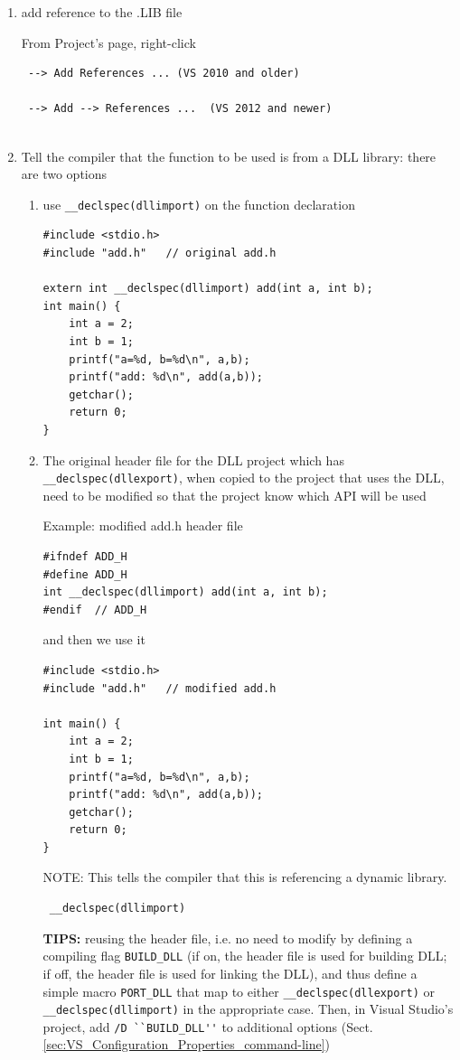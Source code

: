 \begin{enumerate}
  \item add reference to the .LIB file
  
From Project's page, right-click
\begin{verbatim}
 --> Add References ... (VS 2010 and older)
 
 --> Add --> References ...  (VS 2012 and newer)
 
\end{verbatim}
  
  
   \item Tell the compiler that the function to be used is from a DLL library: there are two options
   \begin{enumerate}
     \item use \verb!__declspec(dllimport)! on the function declaration
\begin{verbatim}
#include <stdio.h>
#include "add.h"   // original add.h

extern int __declspec(dllimport) add(int a, int b);
int main() {
    int a = 2;
    int b = 1;
    printf("a=%d, b=%d\n", a,b);
    printf("add: %d\n", add(a,b));
    getchar();
    return 0;
}
\end{verbatim}  
     
   \item The original header file for the DLL project which has \verb!__declspec(dllexport)!, when copied to the
   project that uses the DLL, need to be modified so that the project know which API will be used

Example: modified add.h header file
\begin{verbatim}
#ifndef ADD_H
#define ADD_H
int __declspec(dllimport) add(int a, int b);
#endif  // ADD_H
\end{verbatim}

and then we use it
\begin{verbatim}
#include <stdio.h>
#include "add.h"   // modified add.h

int main() {
    int a = 2;
    int b = 1;
    printf("a=%d, b=%d\n", a,b);
    printf("add: %d\n", add(a,b));
    getchar();
    return 0;
}
\end{verbatim}

NOTE: This tells the compiler that this is referencing a dynamic library.
\begin{verbatim}
 __declspec(dllimport)
\end{verbatim} 
 
 
{\bf TIPS:} reusing the header file, i.e. no need to modify by defining a compiling flag
\verb!BUILD_DLL! (if on, the header file is used for building DLL; if off, the header file is used for linking the DLL), and 
thus define a simple macro \verb!PORT_DLL! that map to either \verb!__declspec(dllexport)! or \verb!__declspec(dllimport)! in the appropriate case.
Then, in Visual Studio's project, add \verb!/D ``BUILD_DLL''! to additional options (Sect.\ref{sec:VS_Configuration_Properties_command-line})
 

\end{enumerate}
\end{enumerate}
